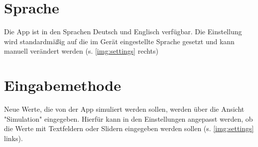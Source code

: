 	\section{Sprache}
	\label{sec:lang}
	
	Die App ist in den Sprachen Deutsch und Englisch verfügbar. Die Einstellung wird standardmäßig auf die im Gerät eingestellte Sprache gesetzt und kann manuell verändert werden (s. \cref{img:settings} rechts)
	
	\section{Eingabemethode}
	\label{sec:input}
	
	Neue Werte, die von der App simuliert werden sollen, werden über die Ansicht "Simulation" eingegeben. Hierfür kann in den Einstellungen angepasst werden, ob die Werte mit Textfeldern oder Slidern eingegeben werden sollen (s. \cref{img:settings} links).
	
